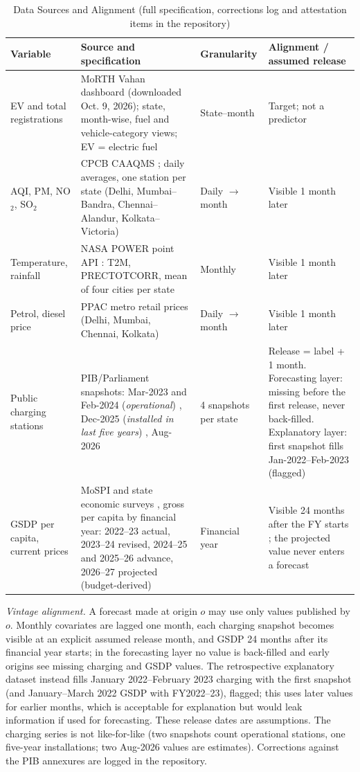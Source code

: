 \begin{table}[!t]
\caption{Data Sources and Alignment (full specification, corrections log and attestation items in the repository)}\label{tab:data}
\centering\footnotesize
\begin{tabular}{p{2.9cm}p{7.0cm}p{2.0cm}p{4.9cm}}
\toprule
\textbf{Variable} & \textbf{Source and specification} & \textbf{Granularity} & \textbf{Alignment / assumed release}\\
\midrule
EV and total registrations & MoRTH Vahan dashboard \cite{vahan} (downloaded Oct. 9, 2026); state, month-wise, fuel and vehicle-category views; EV = electric fuel & State--month & Target; not a predictor\\
AQI, PM, NO$_2$, SO$_2$ & CPCB CAAQMS \cite{cpcb}; daily averages, one station per state (Delhi, Mumbai--Bandra, Chennai--Alandur, Kolkata--Victoria) & Daily $\to$ month & Visible 1 month later\\
Temperature, rainfall & NASA POWER point API \cite{nasa}: T2M, PRECTOTCORR, mean of four cities per state & Monthly & Visible 1 month later\\
Petrol, diesel price & PPAC metro retail prices \cite{ppac} (Delhi, Mumbai, Chennai, Kolkata) & Daily $\to$ month & Visible 1 month later\\
Public charging stations & PIB/Parliament snapshots: Mar-2023 and Feb-2024 (\emph{operational}) \cite{pib23,pib24}, Dec-2025 (\emph{installed in last five years}) \cite{pib25}, Aug-2026 \cite{sansad} & 4 snapshots per state & Release = label + 1 month. Forecasting layer: missing before the first release, never back-filled. Explanatory layer: first snapshot fills Jan-2022--Feb-2023 (flagged)\\
GSDP per capita, current prices & MoSPI and state economic surveys \cite{mospi}, gross per capita by financial year: 2022--23 actual, 2023--24 revised, 2024--25 and 2025--26 advance, 2026--27 projected (budget-derived) & Financial year & Visible 24 months after the FY starts ; the projected value never enters a forecast\\
\bottomrule
\end{tabular}
\end{table}

\textit{Vintage alignment.} A forecast made at origin $o$ may use only values published by $o$. Monthly covariates are lagged one month, each charging snapshot becomes visible at an explicit assumed release month, and GSDP 24 months after its financial year starts; in the forecasting layer no value is back-filled and early origins see missing charging and GSDP values. The retrospective explanatory dataset instead fills January 2022--February 2023 charging with the first snapshot (and January--March 2022 GSDP with FY2022--23), flagged; this uses later values for earlier months, which is acceptable for explanation but would leak information if used for forecasting. These release dates are assumptions. The charging series is not like-for-like (two snapshots count operational stations, one five-year installations; two Aug-2026 values are estimates). Corrections against the PIB annexures are logged in the repository.

